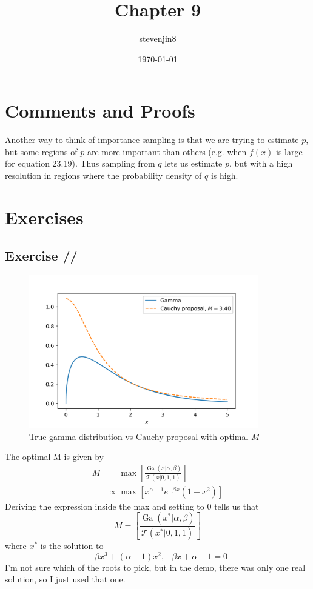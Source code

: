 \documentclass[a4paper,11pt]{article}
\title{Chapter 9}
\author{stevenjin8}
\date{\today}
\DeclareMathOperator*{\Ga}{Ga}
\newcounter{exercise}
\newcounter{subexercise}
\newcommand*{\exercise}[1][]{
  \subsection*{Exercise
    \ifx/#1/\stepcounter{exercise}\arabic{exercise}
    \else#1\fi
  }
  \setcounter{subexercise}{0}
}
\begin{document}
  \maketitle

  \section*{Comments and Proofs}
  Another way to think of importance sampling is that we are trying to estimate $p$, but some
  regions of $p$ are more important than others (e.g. when $f(x)$ is large for equation 23.19).
  Thus sampling from $q$ lets us estimate $p$, but with a high resolution in regions where
  the probability density of $q$ is high.
  \section*{Exercises}
  \setcounter{exercise}{1}
  \exercise
  \begin{figure}[t]
    \centering
    \includegraphics[width=10cm]{rejection-sampling.png}
    \caption{True gamma distribution vs Cauchy proposal with optimal $M$}
  \end{figure}

  The optimal M is given by
  \begin{align*}
    M &= \max \left[\frac{\Ga(x|\alpha, \beta)}{\mathcal{T}(x|0, 1, 1)}\right] \\
    &\propto \max \left[x^{\alpha-1} e^{-\beta x}\left(1+x^2\right)\right]
  \end{align*}
  Deriving the expression inside the max and setting to 0 tells us that
  \[
    M = \left[\frac{\Ga(x^*|\alpha, \beta)}{\mathcal{T}(x^*|0, 1, 1)}\right]
  \]
  where $x^*$ is the solution to
  \[
    -\beta x^3 + (\alpha + 1) x^2, -\beta x + \alpha-1 = 0
  \]
  I'm not sure which of the roots to pick, but in the demo, there was only one real solution, so I
  just used that one.
\end{document}
